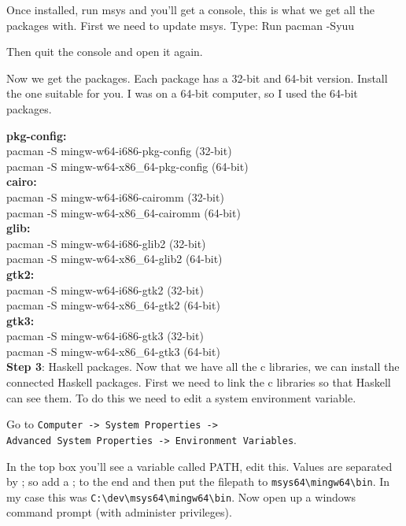 \documentclass[10point]{article}
\begin{document}
Once installed, run msys and you'll get a console, this is what we get all the packages with. First we need to update msys. Type:
Run pacman -Syuu

Then quit the console and open it again.

Now we get the packages. Each package has a 32-bit and 64-bit version. Install the one suitable for you. I was on a 64-bit computer, so I used the 64-bit packages.

\noindent \textbf{pkg-config:}\\
pacman -S mingw-w64-i686-pkg-config    (32-bit)\\
pacman -S mingw-w64-x86\_64-pkg-config  (64-bit)\\

\noindent \textbf{cairo:}\\
pacman -S mingw-w64-i686-cairomm    (32-bit)\\
pacman -S mingw-w64-x86\_64-cairomm  (64-bit)\\

\noindent \textbf{glib:}\\
pacman -S mingw-w64-i686-glib2    (32-bit)\\
pacman -S mingw-w64-x86\_64-glib2  (64-bit)\\

\noindent \textbf{gtk2:}\\
pacman -S mingw-w64-i686-gtk2    (32-bit)\\
pacman -S mingw-w64-x86\_64-gtk2  (64-bit)\\

\noindent \textbf{gtk3:}\\
pacman -S mingw-w64-i686-gtk3    (32-bit)\\
pacman -S mingw-w64-x86\_64-gtk3  (64-bit)\\
\linebreak
\textbf{Step 3}: Haskell packages.
Now that we have all the c libraries, we can install the connected Haskell packages. First we need to link the c libraries so that Haskell can see them. To do this we need to edit a system environment variable.

Go to \verb"Computer -> System Properties ->" \\
\indent \verb"Advanced System Properties -> Environment Variables".

\noindent In the top box you'll see a variable called PATH, edit this. Values are separated by ; so add a ; to the end and then put the filepath to \verb"msys64\mingw64\bin". In my case this was \verb"C:\dev\msys64\mingw64\bin". Now open up a windows command prompt (with administer privileges).
\end{document}
